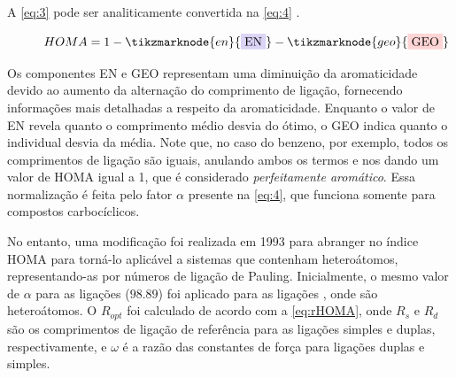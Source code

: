 A \autoref{eq:3} pode ser analiticamente convertida na \autoref{eq:4} \autocite{MarekKrygowski1998}. 

\begin{figure}[htb]
    \vspace{2\baselineskip}
\begin{equation}
    \label{eq:4}
    HOMA = 1 - \tikzmarknode{en}{\highlight{blue}{EN}} - \tikzmarknode{geo}{\highlight{red}{GEO}}
\end{equation}
\vspace{2\baselineskip}
\end{figure}

Os componentes EN e GEO representam uma diminuição da aromaticidade devido ao aumento da alternação do comprimento de ligação, fornecendo informações mais detalhadas a respeito da aromaticidade. Enquanto o valor de EN revela quanto o comprimento médio desvia do ótimo, o GEO indica quanto o individual desvia da média. Note que, no caso do benzeno, por exemplo, todos os comprimentos de ligação são iguais, anulando ambos os termos e nos dando um valor de \gls{HOMA} igual a 1, que é considerado \textit{perfeitamente aromático}. Essa normalização é feita pelo fator $\alpha$ presente na \autoref{eq:4}, que funciona somente para compostos carbocíclicos.

No entanto, uma modificação foi realizada em 1993 para abranger no índice HOMA para torná-lo aplicável a sistemas que contenham heteroátomos, representando-as por números de ligação de Pauling. Inicialmente, o mesmo valor de $\alpha$ para as ligações  ($98.89$) foi aplicado para as ligações , onde  são heteroátomos. O $R_{opt}$ foi calculado de acordo com a \autoref{eq:rHOMA}, onde $R_s$ e $R_d$ são os comprimentos de ligação de referência para as ligações simples e duplas, respectivamente, e $\omega$ é a razão das constantes de força para ligações duplas e simples.

